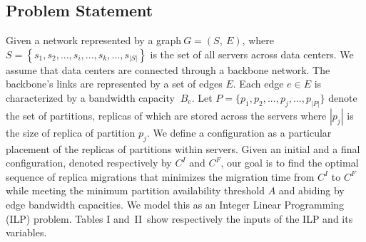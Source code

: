 \subsection{Problem Statement}
Given a network represented by a graph$\ G=(S,\ E)$, where $S=\left\{s_1, s_2, ..., s_i, ..., s_k, ..., s_{\left\vert{}S\right\vert{}}\right\}$ is the set of all servers across data centers. We assume that data centers are connected through a backbone network. The backbone's links are represented by a set of edges   $E$. Each edge $e\in{}E$ is characterized by a bandwidth capacity $\ B_e$. Let $P =\{p_{1}, p_{2}, ..., p_{j}, ..., p_{|P|} \}  $ denote the set of partitions, replicas of which are stored across the servers where  $|p_{j}|$ is the size of replica of partition $p_{j}$. We define a configuration as a particular placement of the replicas of partitions within servers. Given an initial and a final configuration, denoted respectively by $C^I$ and $C^F$, our goal is to find the optimal sequence of replica migrations that minimizes the migration time from $C^I$ to  $C^F$ while meeting the minimum partition availability threshold $A$ and abiding by edge bandwidth capacities. We model this as an Integer Linear Programming (ILP) problem.
Tables I and~II~show respectively the inputs of the ILP and its variables.
